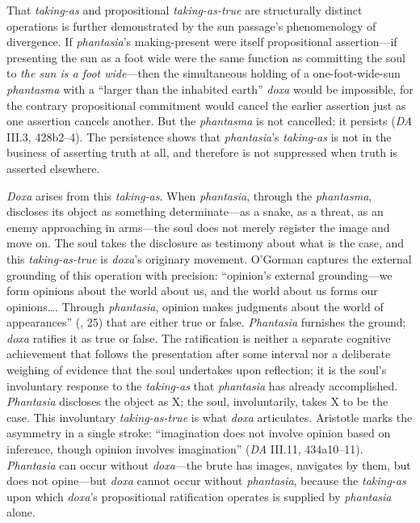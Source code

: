 \documentclass{article}
\begin{document}
That \textit{taking-as} and propositional \textit{taking-as-true} are structurally distinct operations is further demonstrated by the sun passage's phenomenology of divergence. If \textit{phantasia}'s making-present were itself propositional assertion---if presenting the sun as a foot wide were the same function as committing the soul to \textit{the sun is a foot wide}---then the simultaneous holding of a one-foot-wide-sun \textit{phantasma} with a ``larger than the inhabited earth'' \textit{doxa} would be impossible, for the contrary propositional commitment would cancel the earlier assertion just as one assertion cancels another. But the \textit{phantasma} is not cancelled; it persists (\textit{DA} III.3, 428b2--4). The persistence shows that \textit{phantasia}'s \textit{taking-as} is not in the business of asserting truth at all, and therefore is not suppressed when truth is asserted elsewhere.


\textit{Doxa} arises from this \textit{taking-as}. When \textit{phantasia}, through the \textit{phantasma}, discloses its object as something determinate---as a snake, as a threat, as an enemy approaching in arms---the soul does not merely register the image and move on. The soul takes the disclosure as testimony about what is the case, and this \textit{taking-as-true} is \textit{doxa}'s originary movement. O'Gorman captures the external grounding of this operation with precision: ``opinion's external grounding---we form opinions about the world about us, and the world about us forms our opinions\ldots. Through \textit{phantasia}, opinion makes judgments about the world of appearances'' (\cite{ogorman_aristotles_phantasia}, 25) that are either true or false. \textit{Phantasia} furnishes the ground; \textit{doxa} ratifies it as true or false. The ratification is neither a separate cognitive achievement that follows the presentation after some interval nor a deliberate weighing of evidence that the soul undertakes upon reflection; it is the soul's involuntary response to the \textit{taking-as} that \textit{phantasia} has already accomplished. \textit{Phantasia} discloses the object as X; the soul, involuntarily, takes X to be the case. This involuntary \textit{taking-as-true} is what \textit{doxa} articulates. Aristotle marks the asymmetry in a single stroke: ``imagination does not involve opinion based on inference, though opinion involves imagination'' (\textit{DA} III.11, 434a10--11). \textit{Phantasia} can occur without \textit{doxa}---the brute has images, navigates by them, but does not opine---but \textit{doxa} cannot occur without \textit{phantasia}, because the \textit{taking-as} upon which \textit{doxa}'s propositional ratification operates is supplied by \textit{phantasia} alone.
\end{document}

